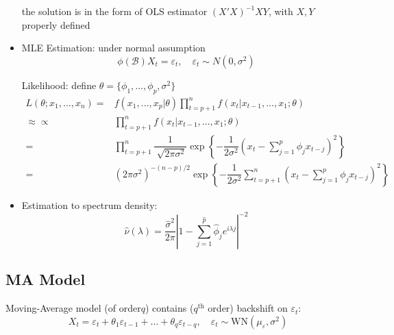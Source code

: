 \begin{itemize}[topsep=2pt,itemsep=0pt]
        the solution is in the form of OLS estimator $ (X'X)^{-1}XY $, with $ X,Y $ properly defined
        
        \item MLE Estimation: under normal assumption
        \begin{equation}
            \phi (\mathscr{B} )X_t=\varepsilon _t,\quad \varepsilon _t\sim N(0,\sigma ^2) 
        \end{equation}

        Likelihood: define $ \theta =\{\phi _1,\ldots,\phi _p,\sigma ^2\} $
        \begin{align}
            L(\theta ; x_1,\ldots ,x_n)=&f(x_1,\ldots,x_p|\theta )\prod_{t=p+1}^nf(x_t|x_{t-1},\ldots,x_{1};\theta )\\
            \approx \propto &\prod_{t=p+1}^nf(x_t|x_{t-1},\ldots,x_{1};\theta )\\
            =&\prod_{t=p+1}^n \dfrac{1}{\sqrt[]{2\pi \sigma ^2}}\exp\left\{ -\dfrac{1}{2\sigma ^2}(x_t-\sum_{j=1}^p \phi _jx_{t-j})^2 \right\}\\
            =&(2\pi\sigma ^2)^{-(n-p)/2}\exp\left\{ -\dfrac{1}{2\sigma ^2}\sum_{t=p+1}^n (x_t-\sum_{j=1}^p \phi _jx_{t-j})^2\right\}
        \end{align}
        
        \item Estimation to spectrum density:
        \begin{equation}
            \hat{\nu }(\lambda )=\dfrac{\hat{\sigma }^2}{2\pi}\left\vert 1-\sum_{j=1}^{\hat{p}}\hat{\phi }_je^{i\lambda j} \right\vert^{-2} 
        \end{equation}
        
    \end{itemize}
    
        


\subsection{MA Model}

    Moving-Average model (of order$ q $) contains ($ q^\mathrm{th}  $ order) backshift on $ \varepsilon _t $:
    \begin{equation}
        X_t=\varepsilon _t+\theta _1\varepsilon _{t-1}+\ldots +\theta _q\varepsilon _{t-q},\quad \varepsilon _t\sim \mathrm{WN}(\mu_\varepsilon  ,\sigma ^2) 
    \end{equation}

